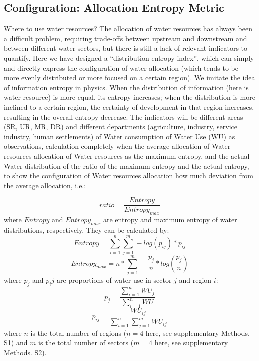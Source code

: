 \documentclass[9pt,twoside,lineno]{pnas-new}
\begin{document}
\subsection*{Configuration: Allocation Entropy Metric}
    Where to use water resources? 
    The allocation of water resources has always been a difficult problem, requiring trade-offs between upstream and downstream and between different water sectors, but there is still a lack of relevant indicators to quantify. Here we have designed a ``distribution entropy index'', which can simply and directly express the configuration of water allocation (which tends to be more evenly distributed or more focused on a certain region). We imitate the idea of information entropy in physics. When the distribution of information (here is water resource) is more equal, its entropy increases; when the distribution is more inclined to a certain region, the certainty of development in that region increases, resulting in the overall entropy decrease.
    The indicators will be different areas (SR, UR, MR, DR) and different departments (agriculture, industry, service industry, human settlements) of Water consumption of Water Use (WU) as observations, calculation completely when the average allocation of Water resources allocation of Water resources as the maximum entropy, and the actual Water distribution of the ratio of the maximum entropy and the actual entropy, to show the configuration of Water resources allocation how much deviation from the average allocation, i.e.:
    
    $$ ratio = \frac{Entropy}{Entropy_{max}} $$
	where $Entropy$ and $Entropy_{max}$ are entropy and maximum entropy of water distributions, respectively. They can be calculated by:
	$$ Entropy = \sum_{i=1}^n \sum_{j=1}^m -log(p_{ij}) * p_{ij} $$
	$$ Entropy_{max} = n * \sum_{j=1}^m -\frac{p_j}{n} * log(\frac{p_j}{n}) $$ 
    where $p_j$ and $p_ij$ are proportions of water use in sector $j$ and region $i$:
	$$ p_j = \frac{\sum_{i=1}^n WU_j}{\sum_{i=1}^n WU} $$
	$$ p_{ij} = \frac{WU_{ij}} {\sum_{i=1}^n \sum_{j=1}^m WU_{ij}} $$
	where $n$ is the total number of regions ($n=4$ here, see supplementary Methods. S1) and $m$ is the total number of sectors ($m=4$ here, see supplementary Methods. S2).
\end{document}
